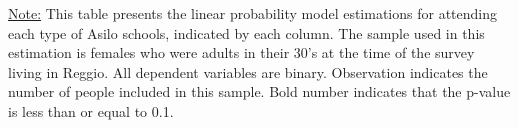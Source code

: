 \begin{footnotesize}
\noindent\underline{Note:} This table presents the linear probability model estimations for attending each type of Asilo schools, indicated by each column. The sample used in this estimation is females who were adults in their 30's at the time of the survey living in Reggio. All dependent variables are binary. Observation indicates the number of people included in this sample. Bold number indicates that the p-value is less than or equal to 0.1.
\end{footnotesize}
